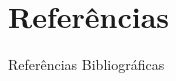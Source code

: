 \documentclass[10pt, aspectratio=169]{beamer}
\begin{document}
\section{Referências}

\begin{frame}[allowframebreaks]{Referências Bibliográficas}
    \tiny
    
     
\end{frame}
\end{document}
